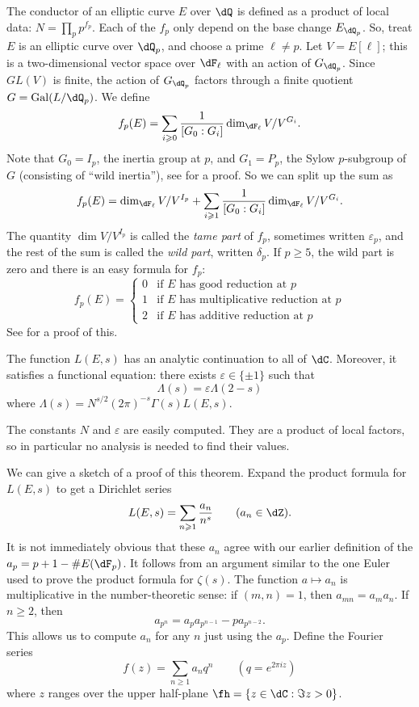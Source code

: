 \documentclass{article}
\begin{document}
The conductor of an elliptic curve $E$ over $\dQ$ is defined as a product of 
local data: $N = \prod_p p^{f_p}$. Each of the $f_p$ only depend on the base 
change $E_{\dQ_p}$. So, treat $E$ is an elliptic curve over $\dQ_p$, and 
choose a prime $\ell\ne p$. Let $V=E[\ell]$; this is a two-dimensional vector 
space over $\dF_\ell$ with an action of $G_{\dQ_p}$. Since $GL(V)$ is finite, 
the action of $G_{\dQ_p}$ factors through a finite quotient 
$G=\gal(L/\dQ_p)$. We define 
\[
  f_p(E) = \sum_{i\geqslant 0} \frac{1}{[G_0:G_i]} \dim_{\dF_\ell} V/V^{G_i} \text{.}
\]
Note that $G_0=I_p$, the inertia group at $p$, and $G_1=P_p$, the Sylow 
$p$-subgroup of $G$ (consisting of ``wild inertia''), see \cite[IV]{se79} for a 
proof. So we can split up the sum as 
\[
  f_p(E) = \dim_{\dF_\ell} V/V^{I_p} + \sum_{i\geqslant 1} \frac{1}{[G_0:G_i]} \dim_{\dF_\ell} V/V^{G_i} \text{.}
\]
The quantity $\dim V/V^{I_p}$ is called the \emph{tame part} of $f_p$, 
sometimes written $\varepsilon_p$, and the 
rest of the sum is called the \emph{wild part}, written $\delta_p$. If 
$p\geqslant 5$, the wild part is zero and there is an easy formula for $f_p$: 
\[
  f_p(E) 
    = \begin{cases}
        0 & \text{if $E$ has good reduction at $p$} \\
        1 & \text{if $E$ has multiplicative reduction at $p$} \\
        2 & \text{if $E$ has additive reduction at $p$} 
      \end{cases}
\]
See \cite[IV.10.2]{si94} for a proof of this. 

\begin{theorem}
The function $L(E,s)$ has an analytic continuation to all of $\dC$. Moreover, 
it satisfies a functional equation: there exists $\varepsilon\in \{\pm 1\}$ such 
that 
\[
  \Lambda(s) = \varepsilon \Lambda(2-s)
\]
where $\Lambda(s) = N^{s/2} (2\pi)^{-s} \Gamma(s) L(E,s)$. 
\end{theorem}

The constants $N$ and $\varepsilon$ are easily computed. They are a product of 
local factors, so in particular no analysis is needed to find their values. 

We can give a sketch of a proof of this theorem. Expand the product formula for 
$L(E,s)$ to get a Dirichlet series 
\[
  L(E,s) = \sum_{n\geqslant 1} \frac{a_n}{n^s} \qquad (a_n\in \dZ) \text{.}
\]
It is not immediately obvious that these $a_n$ agree with our earlier 
definition of the $a_p=p+1-\# E(\dF_p)$. It follows from an argument similar to 
the one Euler used to prove the product formula for $\zeta(s)$. The function 
$a\mapsto a_n$ is multiplicative in the number-theoretic sense: if 
$(m,n)=1$, then $a_{mn}=a_m a_n$. If $n\geqslant 2$, then 
\[
  a_{p^n} = a_p a_{p^{n-1}} - p a_{p^{n-2}} \text{.}
\]
This allows us to compute $a_n$ for any $n$ just using the $a_p$. Define the 
Fourier series 
\[
  f(z) = \sum_{n\geqslant 1} a_n q^n \qquad (q=e^{2\pi i z})
\]
where $z$ ranges over the upper half-plane $\fh=\{z\in \dC:\Im z>0\}$. 
\end{document}
